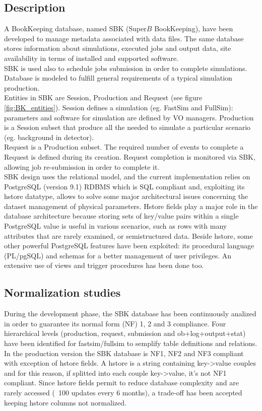 \documentclass[a4paper]{jpconf}
\begin{document}
\subsection{Description}
A BookKeeping database, named SBK (Super$B$ BookKeeping), have been developed to manage metadata associated with data files. The same database stores information about simulations, executed jobs and output data, site availability in terms of installed and supported software.\\
SBK is used also to schedule jobs submission in order to complete simulations.
Database is modeled to fulfill general requirements of a typical simulation production.\\
Entities in SBK are Session, Production and Request (see figure \ref{fig:BK_entities}). Session defines a simulation (eg. FastSim and FullSim): parameters and software for simulation are defined by VO managers. Production is a Session subset that produce all the  needed to simulate a particular scenario (eg. background in detector).\\
Request is a Production subset. The required number of events to complete a Request is defined during its creation. Request completion is monitored via SBK, allowing job re-submission in order to complete it.\\
SBK design uses the relational model, and the current implementation relies on PostgreSQL (version 9.1) RDBMS which is SQL compliant and, exploiting its hstore datatype, allows to solve some major architectural issues concerning the dataset management of physical parameters. Hstore fields play a major role in the database architecture because storing sets of key/value pairs within a single PostgreSQL value is useful in various scenarios, such as rows with many attributes that are rarely examined, or semistructured data. Beside hstore, some other powerful PostgreSQL features have been exploited: its procedural language (PL/pgSQL) and schemas for a better management of user privileges. An extensive use of views and trigger procedures has been done too.

\subsection{Normalization studies}
During the development phase, the SBK database has been continuously analized in order to guarantee its normal form (NF) 1, 2 and 3 compliance. Four hierarchical levels (production, request, submission and ob+log+output+stat) have been identified for fastsim/fullsim to semplify table definitions and relations. In the production version the SBK database is NF1, NF2 and NF3 compliant with exception of hstore fields. A hstore is a string containing key->value couples and for this reason, if splitted into each couple key->value, it's not NF1 compliant. Since hstore fields permit to reduce database complexity and are rarely accessed (~100 updates every 6 months), a trade-off has been accepted keeping hstore columns not normalized.
\end{document}

